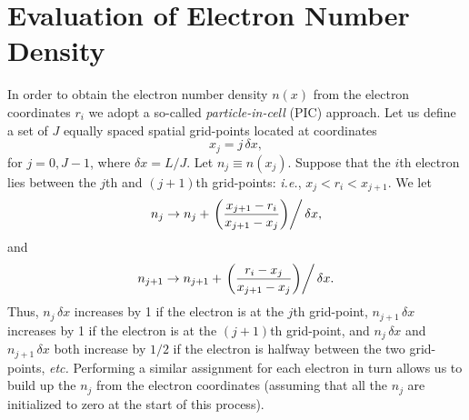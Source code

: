 \section{Evaluation of Electron Number Density}
In order to obtain the electron number density $n(x)$
from the electron coordinates $r_i$ we adopt a so-called {\em particle-in-cell} (PIC) approach.
Let us define a set of $J$ equally
spaced spatial grid-points located at coordinates
\begin{equation}
x_j = j\,\delta x,
\end{equation}
for $j=0,J-1$, where $\delta x = L / J$.  Let $n_j\equiv n(x_j)$.
Suppose that the $i$th electron lies between the $j$th and $(j+1)$th grid-points:
{\em i.e.}, $x_j < r_i < x_{j+1}$. We let
\begin{equation}
n_j  \rightarrow n_j+\left.\left(\frac{x_{j+1}-r_i}{x_{j+1}-x_j}\right)\right/\delta x,
\end{equation}
and
\begin{equation}
n_{j+1} \rightarrow n_{j+1}+ \left.\left(\frac{r_i-x_j}{x_{j+1}-x_j}\right)\right/\delta x.
\end{equation}
Thus, $n_j\,\delta x$ increases by 1 if the electron is at the $j$th grid-point, $n_{j+1}\,\delta x$ 
increases by 1 if the electron is at the $(j+1)$th grid-point, and $n_j\,\delta x$ and $n_{j+1}\,\delta x$
both increase by $1/2$ if the electron is halfway between the two grid-points, {\em etc.}
Performing a similar assignment for each electron in turn allows us to
build up the $n_j$ from the electron coordinates (assuming that all the $n_j$ are initialized
to zero at the start of this process).


